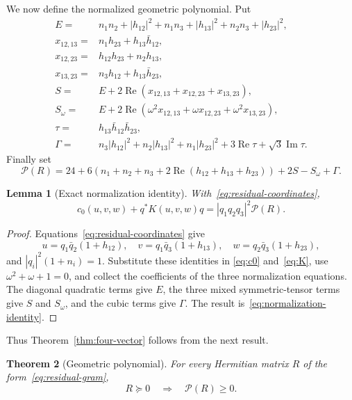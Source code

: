 \documentclass[11pt]{article}
\newtheorem{theorem}{Theorem}[section]
\newtheorem{lemma}[theorem]{Lemma}
\theoremstyle{definition}
\newcommand{\Rea}{\operatorname{Re}}
\newcommand{\Ima}{\operatorname{Im}}
\newcommand{\psd}{\succeq 0}
\begin{document}
We now define the normalized geometric polynomial.  Put
\begin{align}
 E={}&n_1n_2+|h_{12}|^2+n_1n_3+|h_{13}|^2+n_2n_3+|h_{23}|^2,\nonumber\\
 x_{12,13}={}&n_1h_{23}+h_{13}\bar h_{12},\nonumber\\
 x_{12,23}={}&h_{12}h_{23}+n_2h_{13},\nonumber\\
 x_{13,23}={}&n_3h_{12}+h_{13}\bar h_{23},\nonumber\\
 S={}&E+2\Rea(x_{12,13}+x_{12,23}+x_{13,23}),\label{eq:tensor-terms}\\
 S_\omega={}&E+2\Rea(\omega^2x_{12,13}+\omega x_{12,23}
                     +\omega^2x_{13,23}),\nonumber\\
 \tau={}&h_{13}\bar h_{12}\bar h_{23},\nonumber\\
 \Gamma={}&n_3|h_{12}|^2+n_2|h_{13}|^2+n_1|h_{23}|^2
              +3\Rea\tau+\sqrt3\Ima\tau.\nonumber
\end{align}
Finally set
\begin{equation}\label{eq:geometric-P}
 \mathcal P(R)=24+6\left(n_1+n_2+n_3
 +2\Rea(h_{12}+h_{13}+h_{23})\right)+2S-S_\omega+\Gamma.
\end{equation}

\begin{lemma}[Exact normalization identity]\label{lem:normalization-identity}
With~\eqref{eq:residual-coordinates},
\begin{equation}\label{eq:normalization-identity}
 c_0(u,v,w)+q^*K(u,v,w)q
 =|q_1q_2q_3|^2\mathcal P(R).
\end{equation}
\end{lemma}

\begin{proof}
Equations~\eqref{eq:residual-coordinates} give
\[
 u=q_1\bar q_2(1+h_{12}),\quad
 v=q_1\bar q_3(1+h_{13}),\quad
 w=q_2\bar q_3(1+h_{23}),
\]
and $|q_i|^2(1+n_i)=1$.  Substitute these identities in
\eqref{eq:c0} and~\eqref{eq:K}, use
$\omega^2+\omega+1=0$, and collect the coefficients of the three
normalization equations.  The diagonal quadratic terms give $E$, the three
mixed symmetric-tensor terms give $S$ and $S_\omega$, and the cubic terms
give $\Gamma$.  The result is~\eqref{eq:normalization-identity}.
\end{proof}

Thus Theorem~\ref{thm:four-vector} follows from the next result.

\begin{theorem}[Geometric polynomial]\label{thm:Ppositive}
For every Hermitian matrix $R$ of the form~\eqref{eq:residual-gram},
\[
 R\psd\quad\Longrightarrow\quad\mathcal P(R)\geq0.
\]
\end{theorem}
\end{document}
